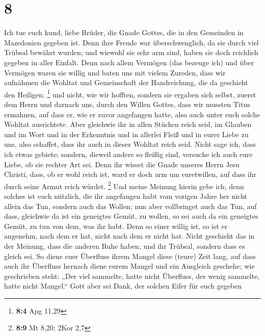 \hypertarget{section-7}{%
\section{8}\label{section-7}}

 Ich tue euch kund, liebe Brüder, die Gnade Gottes, die in
den Gemeinden in Mazedonien gegeben ist.  Denn ihre Freude
war überschwenglich, da sie durch viel Trübsal bewährt wurden; und
wiewohl sie sehr arm sind, haben sie doch reichlich gegeben in aller
Einfalt.  Denn nach allem Vermögen (das bezeuge ich) und
über Vermögen waren sie willig  und baten uns mit vielem
Zureden, dass wir aufnähmen die Wohltat und Gemeinschaft der
Handreichung, die da geschieht den Heiligen; \footnote{\textbf{8:4} Apg
  11,29}  und nicht, wie wir hofften, sondern sie ergaben
sich selbst, zuerst dem Herrn und darnach uns, durch den Willen Gottes,
 dass wir mussten Titus ermahnen, auf dass er, wie er
zuvor angefangen hatte, also auch unter euch solche Wohltat ausrichtete.
 Aber gleichwie ihr in allen Stücken reich seid, im
Glauben und im Wort und in der Erkenntnis und in allerlei Fleiß und in
eurer Liebe zu uns, also schaffet, dass ihr auch in dieser Wohltat reich
seid.  Nicht sage ich, dass ich etwas gebiete; sondern,
dieweil andere so fleißig sind, versuche ich auch eure Liebe, ob sie
rechter Art sei.  Denn ihr wisset die Gnade unseres Herrn
Jesu Christi, dass, ob er wohl reich ist, ward er doch arm um
euretwillen, auf dass ihr durch seine Armut reich würdet. \footnote{\textbf{8:9}
  Mt 8,20; 2Kor 2,7}  Und meine Meinung hierin gebe ich;
denn solches ist euch nützlich, die ihr angefangen habt vom vorigen
Jahre her nicht allein das Tun, sondern auch das Wollen; 
nun aber vollbringet auch das Tun, auf dass, gleichwie da ist ein
geneigtes Gemüt, zu wollen, so sei auch da ein geneigtes Gemüt, zu tun
von dem, was ihr habt.  Denn so einer willig ist, so ist
er angenehm, nach dem er hat, nicht nach dem er nicht hat.
 Nicht geschieht das in der Meinung, dass die anderen
Ruhe haben, und ihr Trübsal, sondern dass es gleich sei. 
So diene euer Überfluss ihrem Mangel diese (teure) Zeit lang, auf dass
auch ihr Überfluss hernach diene eurem Mangel und ein Ausgleich
geschehe;  wie geschrieben steht: „Der viel sammelte,
hatte nicht Überfluss, der wenig sammelte, hatte nicht Mangel.``
 Gott aber sei Dank, der solchen Eifer für euch gegeben
